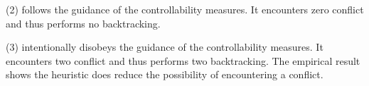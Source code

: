 
(2) follows the guidance of the controllability measures. It encounters zero conflict and thus performs no backtracking.

(3) intentionally disobeys the guidance of the controllability measures. It encounters two conflict and thus performs two backtracking. The empirical result shows the heuristic does reduce the possibility of encountering a conflict.
